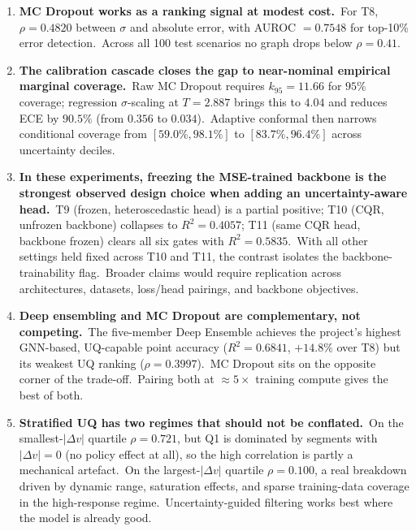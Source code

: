\begin{enumerate}
 \item \textbf{MC Dropout works as a ranking signal at modest cost.}\ For T8, $\rho = 0.4820$ between $\sigma$ and absolute error, with AUROC $= 0.7548$ for top-10\% error detection.\ Across all 100 test scenarios no graph drops below $\rho = 0.41$.

 \item \textbf{The calibration cascade closes the gap to near-nominal empirical marginal coverage.}\ Raw MC Dropout requires $k_{95} = 11.66$ for $95\%$ coverage; regression $\sigma$-scaling at $T = 2.887$ brings this to $4.04$ and reduces ECE by $90.5\%$ (from $0.356$ to $0.034$).\ Adaptive conformal then narrows conditional coverage from $[59.0\%, 98.1\%]$ to $[83.7\%, 96.4\%]$ across uncertainty deciles.

 \item \textbf{In these experiments, freezing the MSE-trained backbone is the strongest observed design choice when adding an uncertainty-aware head.}\ T9 (frozen, heteroscedastic head) is a partial positive; T10 (CQR, unfrozen backbone) collapses to $R^2 = 0.4057$; T11 (same CQR head, backbone frozen) clears all six gates with $R^2 = 0.5835$.\ With all other settings held fixed across T10 and T11, the contrast isolates the backbone-trainability flag.\ Broader claims would require replication across architectures, datasets, loss/head pairings, and backbone objectives.

 \item \textbf{Deep ensembling and MC Dropout are complementary, not competing.}\ The five-member Deep Ensemble achieves the project's highest GNN-based, UQ-capable point accuracy ($R^2 = 0.6841$, $+14.8\%$ over T8) but its weakest UQ ranking ($\rho = 0.3997$).\ MC Dropout sits on the opposite corner of the trade-off.\ Pairing both at $\approx 5\times$ training compute gives the best of both.

 \item \textbf{Stratified UQ has two regimes that should not be conflated.}\ On the smallest-$|\Delta v|$ quartile $\rho = 0.721$, but Q1 is dominated by segments with $|\Delta v| = 0$ (no policy effect at all), so the high correlation is partly a mechanical artefact.\ On the largest-$|\Delta v|$ quartile $\rho = 0.100$, a real breakdown driven by dynamic range, saturation effects, and sparse training-data coverage in the high-response regime.\ Uncertainty-guided filtering works best where the model is already good.
\end{enumerate}

